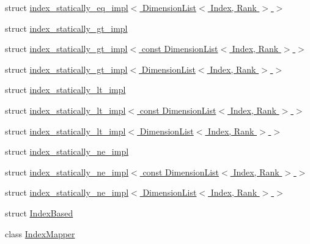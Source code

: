 \begin{DoxyCompactItemize}
\item 
struct \hyperlink{struct_eigen_1_1internal_1_1index__statically__eq__impl_3_01_dimension_list_3_01_index_00_01_rank_01_4_01_4}{index\+\_\+statically\+\_\+eq\+\_\+impl$<$ Dimension\+List$<$ Index, Rank $>$ $>$}
\item 
struct \hyperlink{struct_eigen_1_1internal_1_1index__statically__gt__impl}{index\+\_\+statically\+\_\+gt\+\_\+impl}
\item 
struct \hyperlink{struct_eigen_1_1internal_1_1index__statically__gt__impl_3_01const_01_dimension_list_3_01_index_00_01_rank_01_4_01_4}{index\+\_\+statically\+\_\+gt\+\_\+impl$<$ const Dimension\+List$<$ Index, Rank $>$ $>$}
\item 
struct \hyperlink{struct_eigen_1_1internal_1_1index__statically__gt__impl_3_01_dimension_list_3_01_index_00_01_rank_01_4_01_4}{index\+\_\+statically\+\_\+gt\+\_\+impl$<$ Dimension\+List$<$ Index, Rank $>$ $>$}
\item 
struct \hyperlink{struct_eigen_1_1internal_1_1index__statically__lt__impl}{index\+\_\+statically\+\_\+lt\+\_\+impl}
\item 
struct \hyperlink{struct_eigen_1_1internal_1_1index__statically__lt__impl_3_01const_01_dimension_list_3_01_index_00_01_rank_01_4_01_4}{index\+\_\+statically\+\_\+lt\+\_\+impl$<$ const Dimension\+List$<$ Index, Rank $>$ $>$}
\item 
struct \hyperlink{struct_eigen_1_1internal_1_1index__statically__lt__impl_3_01_dimension_list_3_01_index_00_01_rank_01_4_01_4}{index\+\_\+statically\+\_\+lt\+\_\+impl$<$ Dimension\+List$<$ Index, Rank $>$ $>$}
\item 
struct \hyperlink{struct_eigen_1_1internal_1_1index__statically__ne__impl}{index\+\_\+statically\+\_\+ne\+\_\+impl}
\item 
struct \hyperlink{struct_eigen_1_1internal_1_1index__statically__ne__impl_3_01const_01_dimension_list_3_01_index_00_01_rank_01_4_01_4}{index\+\_\+statically\+\_\+ne\+\_\+impl$<$ const Dimension\+List$<$ Index, Rank $>$ $>$}
\item 
struct \hyperlink{struct_eigen_1_1internal_1_1index__statically__ne__impl_3_01_dimension_list_3_01_index_00_01_rank_01_4_01_4}{index\+\_\+statically\+\_\+ne\+\_\+impl$<$ Dimension\+List$<$ Index, Rank $>$ $>$}
\item 
struct \hyperlink{struct_eigen_1_1internal_1_1_index_based}{Index\+Based}
\item 
class \hyperlink{class_eigen_1_1internal_1_1_index_mapper}{Index\+Mapper}
\item 

\end{DoxyCompactItemize}
